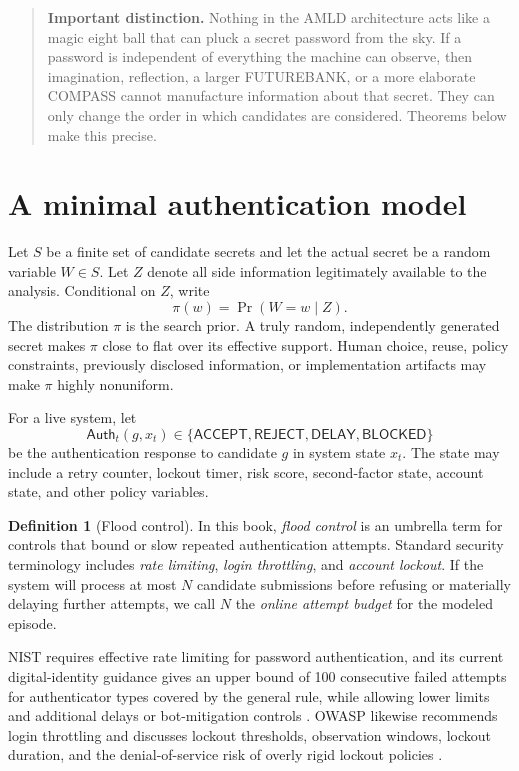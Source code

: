 \documentclass[11pt,openany]{book}
\theoremstyle{definition}
\newtheorem{definition}[theorem]{Definition}
\theoremstyle{remark}
\newenvironment{warningbox}{\begin{quote}\small\color{red!50!black}\textbf{Important distinction.} }{\end{quote}}
\begin{document}
\begin{warningbox}
Nothing in the AMLD architecture acts like a magic eight ball that can pluck a secret password from the sky. If a password is independent of everything the machine can observe, then imagination, reflection, a larger FUTUREBANK, or a more elaborate COMPASS cannot manufacture information about that secret. They can only change the order in which candidates are considered. Theorems below make this precise.
\end{warningbox}

\section{A minimal authentication model}
Let $S$ be a finite set of candidate secrets and let the actual secret be a random variable $W\in S$. Let $Z$ denote all side information legitimately available to the analysis. Conditional on $Z$, write
\[
\pi(w)=\Pr(W=w\mid Z).
\]
The distribution $\pi$ is the search prior. A truly random, independently generated secret makes $\pi$ close to flat over its effective support. Human choice, reuse, policy constraints, previously disclosed information, or implementation artifacts may make $\pi$ highly nonuniform.

For a live system, let
\[
\mathsf{Auth}_t(g,x_t)\in\{\textsf{ACCEPT},\textsf{REJECT},\textsf{DELAY},\textsf{BLOCKED}\}
\]
be the authentication response to candidate $g$ in system state $x_t$. The state may include a retry counter, lockout timer, risk score, second-factor state, account state, and other policy variables.

\begin{definition}[Flood control]
In this book, \emph{flood control} is an umbrella term for controls that bound or slow repeated authentication attempts. Standard security terminology includes \emph{rate limiting}, \emph{login throttling}, and \emph{account lockout}. If the system will process at most $N$ candidate submissions before refusing or materially delaying further attempts, we call $N$ the \emph{online attempt budget} for the modeled episode.
\end{definition}

NIST requires effective rate limiting for password authentication, and its current digital-identity guidance gives an upper bound of 100 consecutive failed attempts for authenticator types covered by the general rule, while allowing lower limits and additional delays or bot-mitigation controls \cite{NIST80063B4}. OWASP likewise recommends login throttling and discusses lockout thresholds, observation windows, lockout duration, and the denial-of-service risk of overly rigid lockout policies \cite{OWASPAuth}.
\end{document}
